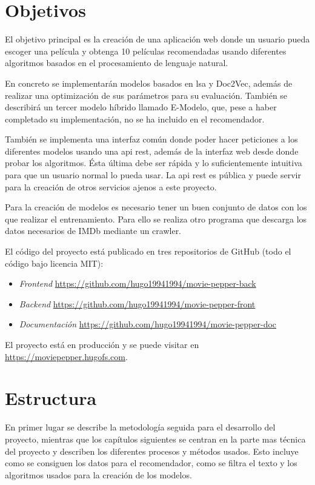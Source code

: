 \documentclass[withindex, glossary]{cam-thesis}
\begin{document}
\section{Objetivos}
El objetivo principal es la creación de una aplicación web donde un usuario pueda escoger una película y obtenga 10 películas recomendadas usando diferentes algoritmos basados en el procesamiento de lenguaje natural.

En concreto se implementarán modelos basados en \acrshort{lsa} y Doc2Vec, además de realizar una optimización de sus parámetros para su evaluación. También se describirá un tercer modelo híbrido llamado E-Modelo\cite{emodelo}, que, pese a haber completado su implementación, no se ha incluido en el recomendador.

También se implementa una interfaz común donde poder hacer peticiones a los diferentes modelos usando una \acrshort{api} \acrshort{rest}, además de la interfaz web desde donde probar los algoritmos. Ésta última debe ser rápida y lo suficientemente intuitiva para que un usuario normal lo pueda usar. La \acrshort{api} \acrshort{rest} es pública y puede servir para la creación de otros servicios ajenos a este proyecto.

Para la creación de modelos es necesario tener un buen conjunto de datos con los que realizar el entrenamiento. Para ello se realiza otro programa que descarga los datos necesarios de IMDb mediante un crawler.

El código del proyecto está publicado en tres repositorios de GitHub (todo el código bajo licencia MIT):

\begin{itemize}
    \item \textit{Frontend} \url{https://github.com/hugo19941994/movie-pepper-back}
    \item \textit{Backend} \url{https://github.com/hugo19941994/movie-pepper-front}
    \item \textit{Documentación} \url{https://github.com/hugo19941994/movie-pepper-doc}
\end{itemize}

El proyecto está en producción y se puede visitar en \url{https://moviepepper.hugofs.com}.

\section{Estructura}
En primer lugar se describe la metodología seguida para el desarrollo del proyecto, mientras que los capítulos siguientes se centran en la parte mas técnica del proyecto y describen los diferentes procesos y métodos usados. Esto incluye como se consiguen los datos para el recomendador, como se filtra el texto y los algoritmos usados para la creación de los modelos.
\end{document}
